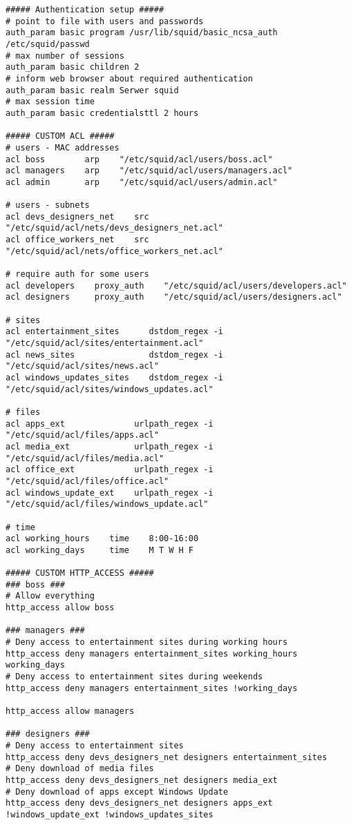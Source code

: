 \documentclass{article}
\begin{document}
\begin{lstlisting}[caption=Zmiany w pliku squid.conf \label{lst:squid-conf}]
##### Authentication setup #####
# point to file with users and passwords
auth_param basic program /usr/lib/squid/basic_ncsa_auth /etc/squid/passwd
# max number of sessions
auth_param basic children 2
# inform web browser about required authentication
auth_param basic realm Serwer squid
# max session time
auth_param basic credentialsttl 2 hours

##### CUSTOM ACL #####
# users - MAC addresses
acl boss        arp    "/etc/squid/acl/users/boss.acl"
acl managers    arp    "/etc/squid/acl/users/managers.acl"
acl admin       arp    "/etc/squid/acl/users/admin.acl"

# users - subnets
acl devs_designers_net    src    "/etc/squid/acl/nets/devs_designers_net.acl"
acl office_workers_net    src    "/etc/squid/acl/nets/office_workers_net.acl"

# require auth for some users
acl developers    proxy_auth    "/etc/squid/acl/users/developers.acl"
acl designers     proxy_auth    "/etc/squid/acl/users/designers.acl"

# sites
acl entertainment_sites      dstdom_regex -i    "/etc/squid/acl/sites/entertainment.acl"
acl news_sites               dstdom_regex -i    "/etc/squid/acl/sites/news.acl"
acl windows_updates_sites    dstdom_regex -i    "/etc/squid/acl/sites/windows_updates.acl"

# files
acl apps_ext              urlpath_regex -i    "/etc/squid/acl/files/apps.acl"
acl media_ext             urlpath_regex -i    "/etc/squid/acl/files/media.acl"
acl office_ext            urlpath_regex -i    "/etc/squid/acl/files/office.acl"
acl windows_update_ext    urlpath_regex -i    "/etc/squid/acl/files/windows_update.acl"

# time
acl working_hours    time    8:00-16:00
acl working_days     time    M T W H F

##### CUSTOM HTTP_ACCESS #####
### boss ###
# Allow everything
http_access allow boss

### managers ###
# Deny access to entertainment sites during working hours
http_access deny managers entertainment_sites working_hours working_days
# Deny access to entertainment sites during weekends
http_access deny managers entertainment_sites !working_days

http_access allow managers

### designers ###
# Deny access to entertainment sites
http_access deny devs_designers_net designers entertainment_sites
# Deny download of media files
http_access deny devs_designers_net designers media_ext
# Deny download of apps except Windows Update
http_access deny devs_designers_net designers apps_ext !windows_update_ext !windows_updates_sites


\end{lstlisting}
\end{document}
